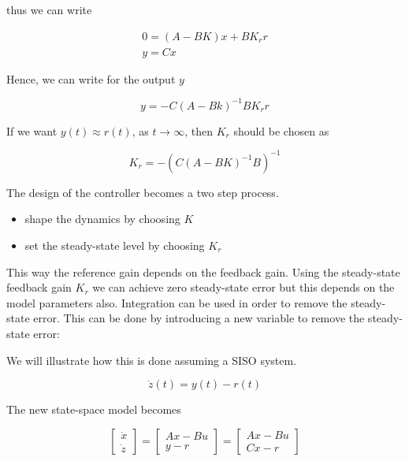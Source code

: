 thus we can write


\begin{eqnarray}
0 = (A-BK)x + BK_r r \\
y = Cx 
\end{eqnarray}


Hence, we can write for the output $y$


\begin{equation}
y = -C(A-Bk)^{-1}BK_r r 
\end{equation}

If we want $y(t) \approx r(t)$, as $ t \rightarrow \infty$, then $K_r$ should be chosen as

\begin{equation}
K_r = - ( C(A-BK)^{-1}B)^{-1} 
\end{equation}

The design of the controller becomes a two step process.

\begin{itemize}

\item shape the dynamics by choosing $K$
\item set the steady-state level by choosing $K_r$
\end{itemize}

This way the reference gain depends on the feedback gain. Using the steady-state feedback gain $K_r$ we can achieve zero steady-state error but this depends on the model parameters also. Integration can be used in order to remove the steady-state error. This can be done by introducing a new variable to remove the steady-state error:

We will illustrate how  this is done assuming a SISO system. 

\begin{equation}
\dot{z}(t) = y(t) - r(t)
\end{equation}

The new state-space model becomes


\begin{equation}
\begin{bmatrix}
 \dot{x} \\
 \dot{z} 
\end{bmatrix} = 
\begin{bmatrix}
 Ax-Bu \\
 y-r 
\end{bmatrix} = 
\begin{bmatrix}
 Ax-Bu \\
 Cx-r  
\end{bmatrix}
\end{equation}


